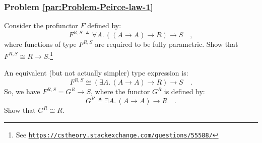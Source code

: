 \subsubsection{Problem \label{par:Problem-Peirce-law-1}\ref{par:Problem-Peirce-law-1}}

Consider the profunctor $F$ defined by:
\[
F^{R,S}\triangleq\forall A.\,((A\rightarrow A)\rightarrow R)\rightarrow S\quad,
\]
where functions of type $F^{R,S}$ are required to be fully parametric.
Show that $F^{R,S}\cong R\rightarrow S$.\footnote{See \texttt{\href{https://cstheory.stackexchange.com/questions/55588/}{https://cstheory.stackexchange.com/questions/55588/}}}

An equivalent (but not actually simpler) type expression is:
\[
F^{R,S}\cong(\exists A.\,(A\rightarrow A)\rightarrow R)\rightarrow S\quad.
\]
So, we have $F^{R,S}=G^{R}\rightarrow S$, where the functor $G^{R}$
is defined by:
\[
G^{R}\triangleq\exists A.\,(A\rightarrow A)\rightarrow R\quad.
\]
Show that $G^{R}\cong R$.


